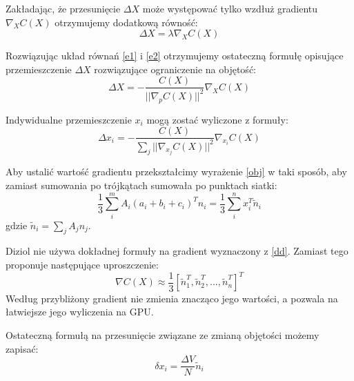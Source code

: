 Zakładając, że przesunięcie $\Delta X$ może występować tylko wzdłuż gradientu $\nabla_X
C(X)$ otrzymujemy dodatkową równość:
\begin{equation}
\label{e2}
\Delta X = \lambda \nabla_X C(X)
\end{equation}

Rozwiązując układ równań \ref{e1} i \ref{e2} otrzymujemy ostateczną formułę
opisujące przemieszczenie $\Delta X$ rozwiązujące ograniczenie na objętość:
\begin{equation*}
\Delta X = - \frac{C(X)}{||\nabla_p C(X)||^2} \nabla_X C(X)
\end{equation*}

Indywidualne przemieszczenie $x_i$ mogą zostać wyliczone z formuły:
\begin{equation}
\Delta x_i = - \frac{C(X)}{\sum_j ||\nabla_{x_j} C(X)||^2} \nabla_{x_i} C(X)
\end{equation}

Aby ustalić wartość gradientu przekształcimy wyrażenie \ref{obj} w taki sposób,
	aby zamiast sumowania po trójkątach sumowała po punktach siatki:
\begin{equation}
\label{dd}
\frac{1}{3} \sum_i^m A_i (a_i + b_i + c_i)^T n_i = \frac{1}{3} \sum_i^n x_i^T
\tilde{n}_i
\end{equation}
gdzie $\tilde{n}_i = \sum_j A_j n_j$.

Diziol \cite{diziol} nie używa dokładnej formuły na gradient wyznaczony z
\ref{dd}. Zamiast tego proponuje następujące uproszczenie:
\begin{equation}
\nabla C(X) \approx \frac{1}{3} [\tilde{n}^T_1, \tilde{n}^T_2, ...,
	\tilde{n}^T_n]^T
\end{equation}
Według \cite{diziol} przybliżony gradient nie zmienia znacząco jego wartości, a
pozwala na łatwiejsze jego wyliczenia na GPU.

Ostateczną formułą na przesunięcie związane ze zmianą objętości możemy zapisać:
\begin{equation}
\delta x_i = \frac{\Delta V}{N} \tilde{n}_i
\end{equation}



